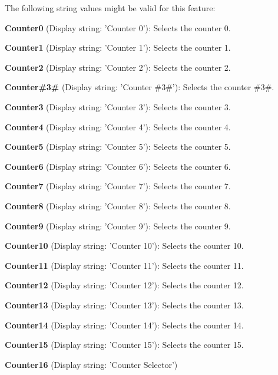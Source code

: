 The following string values might be valid for this feature\+:
\begin{DoxyItemize}
\item {\bfseries Counter0} (Display string\+: 'Counter 0')\+: Selects the counter 0.
\item {\bfseries Counter1} (Display string\+: 'Counter 1')\+: Selects the counter 1.
\item {\bfseries Counter2} (Display string\+: 'Counter 2')\+: Selects the counter 2.
\item {\bfseries Counter\#3\#} (Display string\+: 'Counter \#3\#')\+: Selects the counter \#3\#.
\item {\bfseries Counter3} (Display string\+: 'Counter 3')\+: Selects the counter 3.
\item {\bfseries Counter4} (Display string\+: 'Counter 4')\+: Selects the counter 4.
\item {\bfseries Counter5} (Display string\+: 'Counter 5')\+: Selects the counter 5.
\item {\bfseries Counter6} (Display string\+: 'Counter 6')\+: Selects the counter 6.
\item {\bfseries Counter7} (Display string\+: 'Counter 7')\+: Selects the counter 7.
\item {\bfseries Counter8} (Display string\+: 'Counter 8')\+: Selects the counter 8.
\item {\bfseries Counter9} (Display string\+: 'Counter 9')\+: Selects the counter 9.
\item {\bfseries Counter10} (Display string\+: 'Counter 10')\+: Selects the counter 10.
\item {\bfseries Counter11} (Display string\+: 'Counter 11')\+: Selects the counter 11.
\item {\bfseries Counter12} (Display string\+: 'Counter 12')\+: Selects the counter 12.
\item {\bfseries Counter13} (Display string\+: 'Counter 13')\+: Selects the counter 13.
\item {\bfseries Counter14} (Display string\+: 'Counter 14')\+: Selects the counter 14.
\item {\bfseries Counter15} (Display string\+: 'Counter 15')\+: Selects the counter 15.
\item {\bfseries Counter16} (Display string\+: 'Counter Selector')
\end{DoxyItemize}

